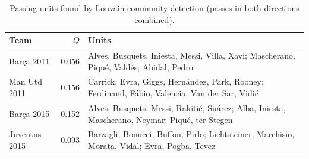 \begin{table}[t]
\centering\small
\caption{Passing units found by Louvain community detection (passes in both directions combined).}
\label{tab:units}
\begin{tabularx}{\textwidth}{lrX}
\toprule
Team & $Q$ & Units \\
\midrule
Barça 2011 & 0.056 & Alves, Busquets, Iniesta, Messi, Villa, Xavi; Mascherano, Piqué, Valdés; Abidal, Pedro \\
Man Utd 2011 & 0.156 & Carrick, Evra, Giggs, Hernández, Park, Rooney; Ferdinand, Fábio, Valencia, Van der Sar, Vidić \\
Barça 2015 & 0.152 & Alves, Busquets, Messi, Rakitić, Suárez; Alba, Iniesta, Mascherano, Neymar; Piqué, ter Stegen \\
Juventus 2015 & 0.093 & Barzagli, Bonucci, Buffon, Pirlo; Lichtsteiner, Marchisio, Morata, Vidal; Evra, Pogba, Tevez \\
\bottomrule
\end{tabularx}
\end{table}
